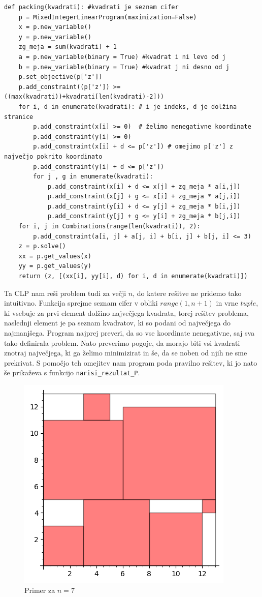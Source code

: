 \documentclass[a4paper, 11pt]{article}
\begin{document}
\begin{verbatim}
def packing(kvadrati): #kvadrati je seznam cifer 
    p = MixedIntegerLinearProgram(maximization=False)
    x = p.new_variable()
    y = p.new_variable()
    zg_meja = sum(kvadrati) + 1
    a = p.new_variable(binary = True) #kvadrat i ni levo od j
    b = p.new_variable(binary = True) #kvadrat j ni desno od j
    p.set_objective(p['z'])
    p.add_constraint((p['z']) >= ((max(kvadrati))+kvadrati[len(kvadrati)-2]))
    for i, d in enumerate(kvadrati): # i je indeks, d je dolžina stranice
        p.add_constraint(x[i] >= 0)  # želimo nenegativne koordinate
        p.add_constraint(y[i] >= 0)
        p.add_constraint(x[i] + d <= p['z']) # omejimo p['z'] z največjo pokrito koordinato
        p.add_constraint(y[i] + d <= p['z'])
        for j , g in enumerate(kvadrati):
            p.add_constraint(x[i] + d <= x[j] + zg_meja * a[i,j])
            p.add_constraint(x[j] + g <= x[i] + zg_meja * a[j,i])
            p.add_constraint(y[i] + d <= y[j] + zg_meja * b[i,j])
            p.add_constraint(y[j] + g <= y[i] + zg_meja * b[j,i])           
    for i, j in Combinations(range(len(kvadrati)), 2):
        p.add_constraint(a[i, j] + a[j, i] + b[i, j] + b[j, i] <= 3)
    z = p.solve()
    xx = p.get_values(x)
    yy = p.get_values(y)
    return (z, [(xx[i], yy[i], d) for i, d in enumerate(kvadrati)])
\end{verbatim}

\noindent Ta CLP nam reši problem tudi za večji $n$, do katere rešitve ne pridemo tako intuitivno. Funkcija 
sprejme seznam cifer v obliki $range(1, n +1)$ in vrne $tuple$, ki vsebuje za prvi element dolžino
največjega kvadrata, torej rešitev problema, naslednji element je pa seznam kvadratov, ki so podani od
največjega do najmanjšega. Program najprej preveri, da so vse koordinate nenegativne, saj sva tako definirala
problem. Nato preverimo pogoje, da morajo biti vsi kvadrati znotraj največjega, ki ga želimo minimizirat in še, da 
se noben od njih ne sme prekrivat. S pomočjo teh omejitev nam program poda pravilno rešitev, ki jo nato še prikaževa s
funkcijo \verb|narisi_rezultat_P|.

\begin{figure}[H]
    \centering
    \includegraphics{Lahek_primer.png}
    \caption{Primer za $n = 7$}
\end{figure}
\end{document}

